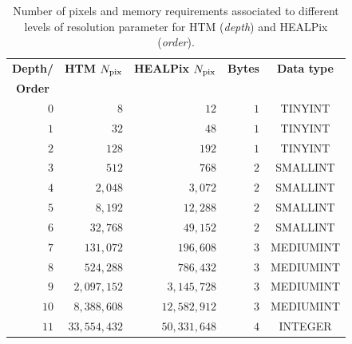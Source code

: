 \documentclass[10pt,titlepage]{article}
\begin{document}
%
\begin{table}[b!]
  \begin{center}
    \caption{Number of pixels and memory requirements associated to
      different levels of resolution parameter for HTM (\emph{depth}\/)
      and HEALPix (\emph{order}\/).}
    \label{tab:depths}
    \footnotesize
    \begin{tabular}{|r|r|r|r|c|}
      \hline
      \multicolumn{1}{|c}{\textbf{Depth/}} &
      \multicolumn{1}{|c|}{\textbf{HTM $N_{\rm pix}$}} &
      \multicolumn{1}{|c|}{\textbf{HEALPix $N_{\rm pix}$}} &
      \textbf{Bytes} & \textbf{Data type}\\
 \multicolumn{1}{|c|}{
       \textbf{Order}} &                   &                       &                &                   \\
      \hline
      $    0 $&$                           8 $&$                             12    $&$         1 $&  TINYINT   \\
      $    1 $&$                          32 $&$                             48    $&$         1 $&  TINYINT   \\
      $    2 $&$                         128 $&$                            192    $&$         1 $&  TINYINT   \\
      $    3 $&$                         512 $&$                            768    $&$         2 $&  SMALLINT  \\
      $    4 $&$                       2,048 $&$                          3,072    $&$         2 $&  SMALLINT  \\
      $    5 $&$                       8,192 $&$                         12,288    $&$         2 $&  SMALLINT  \\
      $    6 $&$                      32,768 $&$                         49,152    $&$         2 $&  SMALLINT  \\
      $    7 $&$                     131,072 $&$                        196,608    $&$         3 $&  MEDIUMINT \\
      $    8 $&$                     524,288 $&$                        786,432    $&$         3 $&  MEDIUMINT \\
      $    9 $&$                   2,097,152 $&$                      3,145,728    $&$         3 $&  MEDIUMINT \\
      $   10 $&$                   8,388,608 $&$                     12,582,912    $&$         3 $&  MEDIUMINT \\
      $   11 $&$                  33,554,432 $&$                     50,331,648    $&$         4 $&  INTEGER   \\

\end{tabular}
\end{center}
\end{table}
\end{document}
